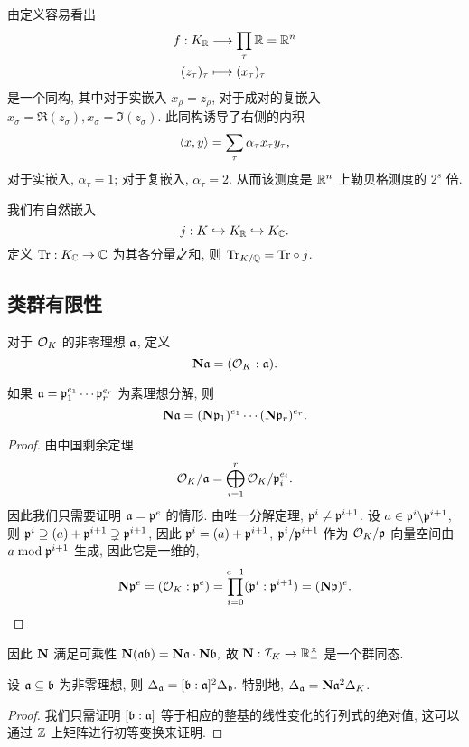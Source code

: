 由定义容易看出
\begin{equation}\label{eq:minkow_iso}
	\fct{f: K_\BR}{\prod_\tau \BR=\BR^n}{(z_\tau)_\tau}{(x_\tau)_\tau}
\end{equation}
是一个同构, 其中对于实嵌入 $x_\rho=z_\rho$, 对于成对的复嵌入 $x_\sigma=\Re(z_\sigma),x_{\bar \sigma}=\Im(z_\sigma)$.
此同构诱导了右侧的内积
\begin{equation}\label{eq:tau}
	\pair{x,y}=\sum_{\tau} \alpha_\tau x_\tau y_\tau,
\end{equation}
对于实嵌入, $\alpha_\tau=1$; 对于复嵌入, $\alpha_\tau=2$.
从而该测度是 $\BR^n$ 上勒贝格测度的 $2^s$ 倍.


我们有自然嵌入
	\[j:K\inj K_\BR\inj K_\BC.\]
定义 $\Tr:K_\BC\to \BC$ 为其各分量之和, 则 $\Tr_{K/\BQ}=\Tr\circ j$.


\subsection{类群有限性}

对于 $\CO_K$ 的非零理想 $\fa$, 定义
	\[\bfN\fa=(\CO_K:\fa).\]

\begin{theorem}{}{}
如果 $\fa=\fp_1^{e_1}\cdots\fp_r^{e_r}$ 为素理想分解, 则
	\[\bfN\fa=(\bfN\fp_1)^{e_1}\cdots(\bfN\fp_r)^{e_r}.\]
\end{theorem}
\begin{proof}
由中国剩余定理
	\[\CO_K/\fa=\bigoplus_{i=1}^r\CO_K/\fp_i^{e_i}.\]
因此我们只需要证明 $\fa=\fp^e$ 的情形. 由唯一分解定理, $\fp^i\neq \fp^{i+1}$. 设 $a\in\fp^i\bs \fp^{i+1}$, 则 $\fp^i\supseteq (a)+\fp^{i+1}\supsetneq \fp^{i+1}$, 因此 $\fp^i=(a)+\fp^{i+1}$, $\fp^i/\fp^{i+1}$ 作为 $\CO_K/\fp$ 向量空间由 $a\mod \fp^{i+1}$ 生成, 因此它是一维的,
	\[\bfN\fp^e=(\CO_K:\fp^e)=\prod_{i=0}^{e-1} (\fp^i:\fp^{i+1})=(\bfN\fp)^e.\]
\end{proof}

因此 $\bfN$ 满足可乘性 $\bfN(\fa\fb)=\bfN\fa \cdot\bfN\fb,$ 故 $\bfN:\CI_K\to \BR_+^\times$ 是一个群同态.

\begin{proposition}{}{}
设 $\fa\subseteq \fb$ 为非零理想, 则 $\Delta_\fa=[\fb:\fa]^2\Delta_\fb.$
特别地, $\Delta_\fa=\bfN\fa^2 \Delta_K$.
\end{proposition}
\begin{proof}
我们只需证明 $[\fb:\fa]$ 等于相应的整基的线性变化的行列式的绝对值, 这可以通过 $\BZ$ 上矩阵进行初等变换来证明.
\end{proof}

